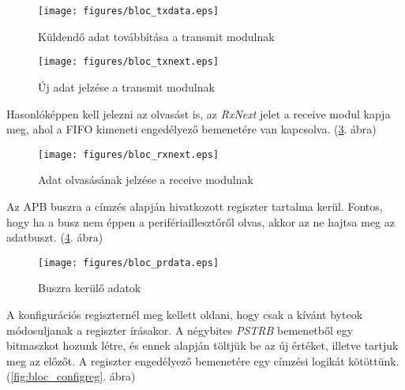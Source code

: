 \begin{figure}[h]
\vspace{0.5cm}
\begin{center}
\texttt{[image: figures/bloc\_txdata.eps]}
\caption{Küldendő adat továbbítása a transmit modulnak}
\label{fig:bloc_txdata}
\end{center}
\vspace{0.5cm}
\end{figure}
\begin{figure}[h]
\vspace{0.5cm}
\begin{center}
\texttt{[image: figures/bloc\_txnext.eps]}
\caption{Új adat jelzése a transmit modulnak}
\label{fig:bloc_txnext}
\end{center}
\vspace{0.5cm}
\end{figure}

Hasonlóképpen kell jelezni az olvasást is, az \textit{RxNext} jelet a receive modul kapja meg, ahol a FIFO kimeneti engedélyező bemenetére van kapcsolva. (\ref{fig:bloc_rxnext}. ábra)

\begin{figure}[h]
\vspace{0.5cm}
\begin{center}
\texttt{[image: figures/bloc\_rxnext.eps]}
\caption{Adat olvasásának jelzése a receive modulnak}
\label{fig:bloc_rxnext}
\end{center}
\vspace{0.5cm}
\end{figure}

Az APB buszra a címzés alapján hivatkozott regiszter tartalma kerül. Fontos, hogy ha a busz nem éppen a perifériaillesztőről olvas, akkor az ne hajtsa meg az adatbuszt. (\ref{fig:bloc_prdata}. ábra)

\begin{figure}[h]
\vspace{0.5cm}
\begin{center}
\texttt{[image: figures/bloc\_prdata.eps]}
\caption{Buszra kerülő adatok}
\label{fig:bloc_prdata}
\end{center}
\vspace{0.5cm}
\end{figure}

A konfigurációs regiszternél meg kellett oldani, hogy csak a kívánt byteok módosuljanak a regiszter írásakor. A négybites \textit{PSTRB} bemenetből egy bitmaszkot hozunk létre, és ennek alapján töltjük be az új értéket, illetve tartjuk meg az előzőt. A regiszter engedélyező bemenetére egy címzési logikát kötöttünk. (\ref{fig:bloc_configreg}. ábra)


